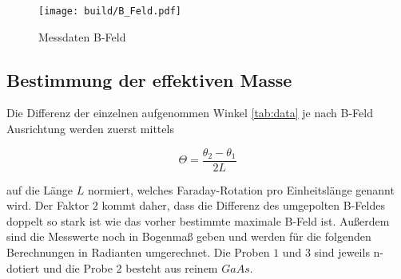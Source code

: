 \begin{figure}[H]
	\centering
	\texttt{[image: build/B\_Feld.pdf]}
	\caption{Messdaten B-Feld}\label{fig:B_Feld}
\end{figure}

\subsection{Bestimmung der effektiven Masse}
Die Differenz der einzelnen aufgenommen Winkel \eqref{tab:data} je nach B-Feld Ausrichtung werden zuerst mittels 

\begin{equation}
    \Theta =\frac{\theta_2 - \theta_1}{2L} 
\end{equation}

auf die Länge $L$ normiert, welches Faraday-Rotation pro Einheitslänge genannt wird.  
Der Faktor $2$ kommt daher, dass die Differenz des umgepolten B-Feldes doppelt so stark ist wie das vorher bestimmte maximale B-Feld ist. 
Außerdem sind die Messwerte noch in Bogenmaß geben und werden für die folgenden Berechnungen in Radianten umgerechnet. 
Die Proben $1$ und $3$ sind jeweils n-dotiert und die Probe 2 besteht aus reinem $GaAs$. 

